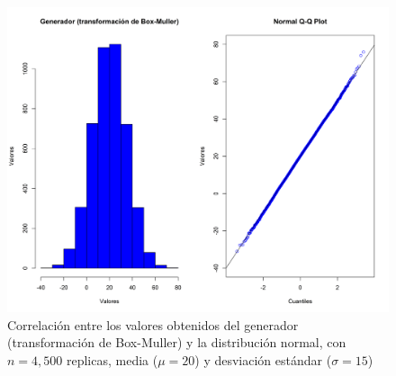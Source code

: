\documentclass{article}
\begin{document}
\begin{figure}
\centering
\includegraphics[width=\linewidth]{Figures/uniformeNormal.png}
\caption{Correlación entre los valores obtenidos del generador (transformación de Box-Muller) y la distribución normal, con $n= 4,500$ replicas, media ($\mu = 20$) y desviación estándar ($\sigma = 15$)}
\label{uniformeNormal}
\end{figure}




\end{document}
